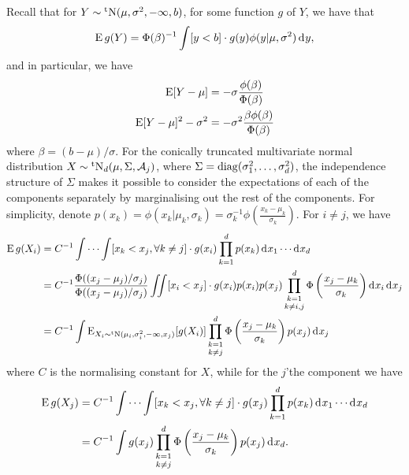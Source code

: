 Recall that for $Y \sim \operatorname{{}^tN}(\mu,\sigma^2,-\infty,b)$, for some function $g$ of $Y$, we have that
\[
  \operatorname{E} g(Y) = \Phi(\beta)^{-1} \int [y < b] \cdot g(y)  \phi(y|\mu,\sigma^2) \operatorname{d}\hspace{0.5pt}\! y,
\]
and in particular, we have
\begin{align}
  \operatorname{E}[Y - \mu] &= -\sigma \frac{\phi(\beta)}{\Phi(\beta)} \label{eq:tnXminMu} \\
  \operatorname{E}[Y - \mu]^2 - \sigma^2 &= -\sigma^2   \frac{ \beta\phi(\beta)}{\Phi(\beta)} \label{eq:tnXminMusq}
\end{align}
where $\beta = (b - \mu)/\sigma$.
For the conically truncated multivariate normal distribution $X \sim \operatorname{{}^tN}_d(\mu,\Sigma,{\mathcal A}_j)$, where $\Sigma = \operatorname{diag}(\sigma_1^2,\dots,\sigma_d^2)$, the independence structure of $\Sigma$ makes it possible to consider the expectations of each of the components separately by marginalising out the rest of the components. 
For simplicity, denote $p(x_k) = \phi(x_k|\mu_k,\sigma_k) = \sigma^{-1}_k \phi(\frac{x_k - \mu_k}{\sigma_k})$.
For $i \neq j$, we have
\begin{align}
  \operatorname{E} g(X_i)
  &= C^{-1} \idotsint [x_k < x_j, \forall k \neq j] \cdot g(x_i) \prod_{k=1}^d p(x_k) \operatorname{d}\hspace{0.5pt}\! x_1 \cdots \operatorname{d}\hspace{0.5pt}\! x_d \nonumber \\
  &= C^{-1} \frac{\Phi((x_j-\mu_j)/\sigma_j)}{\Phi((x_j-\mu_j)/\sigma_j)} \iint [x_i < x_j] \cdot g(x_i) p(x_i) p(x_j) \mathop{\prod_{k=1}^d}_{k \neq i,j} \Phi \left( \frac{x_j - \mu_k}{\sigma_k} \right)  \operatorname{d}\hspace{0.5pt}\! x_i \operatorname{d}\hspace{0.5pt}\! x_j \nonumber \\
  &= C^{-1}  \int \operatorname{E}_{X_i\sim\operatorname{{}^tN}(\mu_i,\sigma_i^2,-\infty,x_j)} [g(X_i)] \mathop{\prod_{k=1}^d}_{k \neq j} \Phi \left( \frac{x_j - \mu_k}{\sigma_k} \right)  p(x_j)\operatorname{d}\hspace{0.5pt}\! x_j \label{eq:tnproofi}
  \end{align}
where $C$ is the normalising constant for $X$, while for the $j$'the component we have
\begin{align}
  \operatorname{E} g(X_j)
  &= C^{-1} \idotsint  [x_k < x_j, \forall k \neq j] \cdot g(x_j)  \prod_{k=1}^d p(x_k) \operatorname{d}\hspace{0.5pt}\! x_1 \cdots \operatorname{d}\hspace{0.5pt}\! x_d \nonumber \\
  &= C^{-1} \int  g(x_j)  \mathop{\prod_{k=1}^d}_{k \neq j} \Phi \left( \frac{x_j - \mu_k}{\sigma_k} \right) p(x_j) \operatorname{d}\hspace{0.5pt}\! x_d. \label{eq:tnproofj}  
\end{align}

